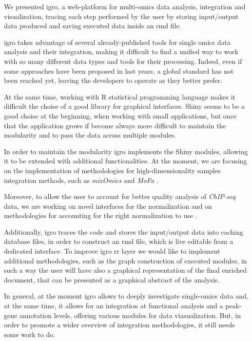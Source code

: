 We presented \gls{igro}, a web-platform for multi-omics data analysis, integration and visualization, tracing each step performed by the user by storing input/output data produced and saving executed data inside an \gls{rmd} file.

\gls{igro} takes advantage of several already-published tools for single omics data analysis and their integration, making it difficult to find a unified way to work with so many different data types and tools for their processing.
Indeed, even if some approaches have been proposed in last years, a global standard has not been reached yet, leaving the developers to operate as they better prefer.

At the same time, working with R statistical programming language makes it difficult the choise of a good library for graphical interfaces.
Shiny seems to be a good choise at the beginning, when working with small applications, but once that the application grows if become always more difficult to maintain the modularity and to pass the data across multiple modules.

In order to maintain the modularity \gls{igro} implements the Shiny modules, allowing it to be extended with additional functionalities. At the moment, we are focusing on the implementation of methodologies for high-dimensionality samples integration methods, such as \textit{mixOmics} \cite{Rohart2017} and \textit{MoFa} \cite{Argelaguet2018}.

Moreover, to allow the user to account for better quality analysis of \textit{ChIP-seq} data, we are working on novel interfaces for the normalization and on methodologies for accounting for the right normalization to use \cite{Angelini2015}.

Additionally, \gls{igro} traces the code and stores the input/output data into caching database files, in order to construct an \gls{rmd} file, which is live editable from a dedicated interface.
To improve \gls{igro} \gls{rr} layer we would like to implement additional methodologies, such as the graph construction of executed modules, in such a way the user will have also a graphical representation of the final enriched document, that can be presented as a graphical abstract of the analysis.

In general, at the moment \gls{igro} allows to deeply investigate single-omics data and, at the same time, it allows for an integration at functional analysis and a peak-gene annotation levels, offering various modules for data viasualization.
But, in order to promote a wider overview of integration methodologies, it still needs some work to do.
